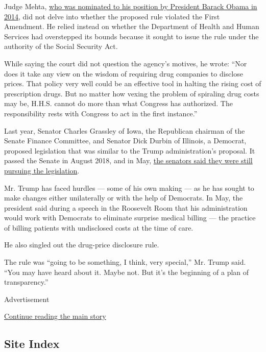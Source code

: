 Judge Mehta,
\href{https://www.dcd.uscourts.gov/content/district-judge-amit-p-mehta}{who
was nominated to his position by President Barack Obama in 2014}, did
not delve into whether the proposed rule violated the First Amendment.
He relied instead on whether the Department of Health and Human Services
had overstepped its bounds because it sought to issue the rule under the
authority of the Social Security Act.

While saying the court did not question the agency's motives, he wrote:
``Nor does it take any view on the wisdom of requiring drug companies to
disclose prices. That policy very well could be an effective tool in
halting the rising cost of prescription drugs. But no matter how vexing
the problem of spiraling drug costs may be, H.H.S. cannot do more than
what Congress has authorized. The responsibility rests with Congress to
act in the first instance.''

Last year, Senator Charles Grassley of Iowa, the Republican chairman of
the Senate Finance Committee, and Senator Dick Durbin of Illinois, a
Democrat, proposed legislation that was similar to the Trump
administration's proposal. It passed the Senate in August 2018, and in
May,
\href{https://www.grassley.senate.gov/news/news-releases/grassley-durbin-statement-hhs-rule-require-disclosure-prescription-drug-prices-tv}{the
senators said they were still pursuing the legislation}.

Mr. Trump has faced hurdles --- some of his own making --- as he has
sought to make changes either unilaterally or with the help of
Democrats. In May, the president said during a speech in the Roosevelt
Room that his administration would work with Democrats to eliminate
surprise medical billing --- the practice of billing patients with
undisclosed costs at the time of care.

He also singled out the drug-price disclosure rule.

The rule was ``going to be something, I think, very special,'' Mr. Trump
said. ``You may have heard about it. Maybe not. But it's the beginning
of a plan of transparency.''

Advertisement

\protect\hyperlink{after-bottom}{Continue reading the main story}

\hypertarget{site-index}{%
\subsection{Site Index}\label{site-index}}

